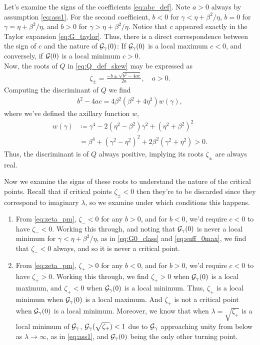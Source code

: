 \documentclass[a4paper,10pt]{article}
\begin{document}
{\begin{itemize}
Let's examine the signs of the coefficients \eqref{eq:abc_def}. Note $a > 0$ always by assumption \eqref{eq:ass1}. For the second coefficient, $b < 0$ for $\gamma < \eta + \beta^2 / \eta$, $b = 0$ for $\gamma = \eta + \beta^2 / \eta$, and $b > 0$ for $\gamma > \eta + \beta^2 / \eta$. Notice that $c$ appeared exactly in the Taylor expansion \eqref{eq:G_taylor}. Thus, there is a direct correspondence between the sign of $c$ and the nature of ${\cal G}_{\gamma}(0)$: If ${\cal G}_{\gamma}(0)$ is a local maximum $c < 0$, and conversely, if ${\cal G}(0)$ is a local minimum $c > 0$. \\

Now, the roots of $Q$ in \eqref{eq:Q_def_skew} may be expressed as
\begin{align} \label{eq:zeta_pm}
\zeta_{\pm} = \frac{-b \pm \sqrt{b^2 - 4ac}}{2a}, \quad a > 0.
\end{align}
Computing the discriminant of $Q$ we find
\begin{align*}
b^2 - 4ac = 4 \beta^2 (\beta^2 + 4 \eta^2) w(\gamma),
\end{align*}
where we've defined the axillary function $w$,
\begin{align}
\label{eq:w_def}
w(\gamma) 
&\coloneqq 
\gamma^4 - 2( \eta^2 - \beta^2) \gamma^2 + \left( \eta^2 + \beta^2 \right)^2 \\
\label{eq:w_pos}
&=
\beta^4 + (\gamma^2 - \eta^2)^2 + 2 \beta^2(\gamma^2 + \eta^2) > 0. 
\end{align}
Thus, the discriminant is of $Q$ always positive, implying its roots $\zeta_{\pm}$ are always real.

Now we examine the signs of these roots to understand the nature of the critical points. Recall that if critical points $\zeta_{\pm}  < 0$ then they're to be discarded since they correspond to imaginary $\lambda$, so we examine under which conditions this happens. 
\begin{enumerate}
\setlength{\itemsep}{2ex}

\item From \eqref{eq:zeta_pm}, $\zeta_- < 0$ for any $b > 0$, and for $b<0$, we'd require $c < 0$ to have $\zeta_- < 0$. Working this through, and noting that ${\cal G}_{\gamma}(0)$ is never a local minimum for $\gamma < \eta + \beta^2 / \eta$, as in \eqref{eq:G0_class} and \eqref{eq:suff_0max}, we find that $\zeta_- < 0$ always, and so it is never a critical point.

\item From \eqref{eq:zeta_pm}, $\zeta_+ > 0$ for any $b < 0$, and for $b > 0$, we'd require $c < 0$ to have $\zeta_+ > 0$. Working this through, we find $\zeta_+ > 0$ when ${\cal G}_{\gamma}(0)$ is a local maximum, and $\zeta_+ < 0$ when ${\cal G}_{\gamma}(0)$ is a local minimum. Thus, $\zeta_+$ is a local minimum when ${\cal G}_{\gamma}(0)$ is a local maximum. And $\zeta_+$ is not a critical point when ${\cal G}_{\gamma}(0)$ is a local minimum. Moreover, we know that when $\lambda = \sqrt{\zeta_+}$ is a local minimum of ${\cal  G}_{\gamma}$, ${\cal G}_{\gamma}(\sqrt{\zeta_+}) < 1$ due to ${\cal G}_{\gamma}$ approaching unity from below as $\lambda \to \infty$, as in \eqref{eq:ass1}, and ${\cal G}_{\gamma}(0)$ being the only other turning point.


\end{enumerate}
\end{itemize}}
\end{document}
